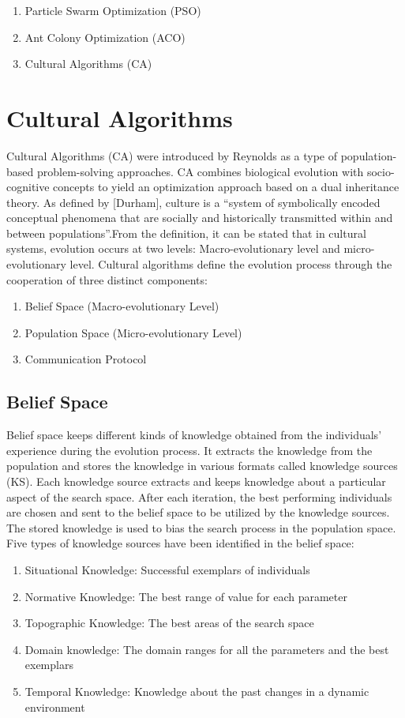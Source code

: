 \begin{enumerate}
	\item Particle Swarm Optimization (PSO)
	\item Ant Colony Optimization (ACO)
	\item Cultural Algorithms (CA)
\end{enumerate}
\section{Cultural Algorithms}
Cultural Algorithms (CA) were introduced by Reynolds as a type of population-based problem-solving approaches. CA combines biological evolution with socio-cognitive concepts to yield an optimization approach based on a dual inheritance theory. As defined by [Durham], culture is a \enquote{system of symbolically encoded conceptual phenomena that are socially and historically transmitted within and between populations}.From the definition, it can be stated that in cultural systems, evolution occurs at two levels: Macro-evolutionary level and micro-evolutionary level. Cultural algorithms define the evolution process through the cooperation of three distinct components: 
\begin{enumerate}
	\item Belief Space (Macro-evolutionary Level)
	\item Population Space (Micro-evolutionary Level)
	\item Communication Protocol
\end{enumerate}
\subsection{Belief Space}
Belief space keeps different kinds of knowledge obtained from the individuals' experience during the evolution process. It extracts the knowledge from the population and stores the knowledge in various formats called knowledge sources (KS). Each knowledge source extracts and keeps knowledge about a particular aspect of the search space. 
\newline
After each iteration, the best performing individuals are chosen and sent to the belief space to be utilized by the knowledge sources. The stored knowledge is used to bias the search process in the population space. Five types of knowledge sources have been identified in the belief space:
\begin{enumerate}
	\item Situational Knowledge: Successful exemplars of individuals
	\item Normative Knowledge: The best range of value for each parameter
	\item Topographic Knowledge: The best areas of the search space
	\item Domain knowledge: The domain ranges for all the parameters and the best exemplars
	\item Temporal Knowledge: Knowledge about the past changes in a dynamic environment
\end{enumerate}
